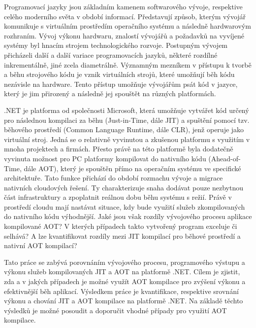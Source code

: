 Programovací jazyky jsou základním kamenem softwarového vývoje, respektive celého moderního světa v období informací. Představují způsob, kterým vývojář komunikuje s virtuálním prostředím operačního systému a následně hardwarovým rozhraním. Vývoj výkonu hardwaru, znalostí vývojářů a požadavků na vyvíjené systémy byl hnacím strojem technologického rozvoje. Postupným vývojem přicházeli další a další variace programovacích jazyků, některé rozdílné inkrementálně, jiné zcela diametrálně. Významným mezníkem v přístupu k tvorbě a běhu strojového kódu je vznik virtuálních strojů, které umožňují běh kódu nezávisle na hardware. Tento přístup umožňuje vývojářům psát kód v jazyce, který je jim přirozený a následně jej spouštět na různých platformách.

.NET je platforma od společnosti Microsoft, která umožňuje vytvářet kód určený pro následnou kompilaci za běhu (Just-in-Time, dále JIT) a spuštění pomocí tzv. běhového prostředí (Common Language Runtime, dále CLR), jenž operuje jako virtuální stroj. Jedná se o relativně vyvinutou a zkušenou platformu s využitím v mnoha projektech a firmách. Přesto právě na této platformě byla dodatečně vyvinuta možnost pro PC platformy kompilovat do nativního kódu (Ahead-of-Time, dále AOT), který je spouštěn přímo na operačním systému ve specifické architektuře. Tato funkce přichází do období rozmachu vývoje a migrace nativních cloudových řešení. Ty charakterizuje snaha dodávat pouze nezbytnou část infrastruktury a zpoplatnit reálnou dobu běhu systému s režií. Právě v prostředí cloudu mají nastávat situace, kdy bude využití služeb zkompilovaných do nativního kódu výhodnější. Jaké jsou však rozdíly vývojového procesu aplikace kompilované AOT? V kterých případech takto vytvořený program exceluje či selhává? A lze kvantifikovat rozdíly mezi JIT kompilací pro běhové prostředí a nativní AOT kompilací?

Tato práce se zabývá porovnáním vývojového procesu, programového výstupu a výkonu služeb kompilovaných JIT a AOT na platformě .NET. Cílem je zjistit, zda a v jakých případech je možné využít AOT kompilace pro zvýšení výkonu a efektivnější běh aplikací. Výsledkem práce je kvantifikace, respektive srovnání výkonu a chování JIT a AOT kompilace na platformě .NET. Na základě těchto výsledků je možné posoudit a doporučit vhodné případy pro využití AOT kompilace.